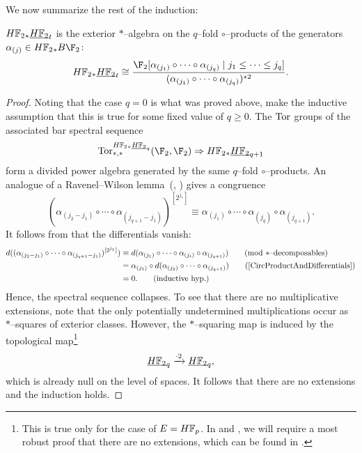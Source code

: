 We now summarize the rest of the induction:
\begin{theorem}\label{UnstableSteenrodInduction}
\(\HFtwo_* \OS{\HFtwo}{t}\) is the exterior \(\ast\)--algebra on the \(q\)--fold \(\circ\)--products of the generators \(\alpha_{(j)} \in \HFtwo_* B\F_2\): \[\HFtwo_* \OS{\HFtwo}{t} \cong \frac{\F_2[\alpha_{(j_1)} \circ \cdots \circ \alpha_{(j_q)} \mid j_1 \le \cdots \le j_q]}{(\alpha_{(j_1)} \circ \cdots \circ \alpha_{(j_q)})^{\ast 2}}.\]
\end{theorem}
\begin{proof}
Noting that the case \(q = 0\) is what was proved above, make the inductive assumption that this is true for some fixed value of \(q \ge 0\).  The \(\operatorname{Tor}\) groups of the associated bar spectral sequence \[\Tor^{\HFtwo_* \OS{\HFtwo}{q}}_{*, *}(\F_2, \F_2) \Rightarrow \HFtwo_* \OS{\HFtwo}{q+1}\] form a divided power algebra generated by the same \(q\)--fold \(\circ\)--products.  An analogue of a Ravenel--Wilson lemma~(\cite[Lemma 9.5]{RavenelWilsonKthyOfEMSpaces}, \cite[Claim 8.16]{Wilson}) gives a congruence \[(\alpha_{(j_2-j_1)} \circ \cdots \circ \alpha_{(j_{q+1}-j_1)})^{[2^{j_1}]} \equiv \alpha_{(j_1)} \circ \cdots \circ \alpha_{(j_q)} \circ \alpha_{(j_{q+1})} \tag{mod \(\ast\)--decomposables}.\]  It follows from  that the differentials vanish:
\begin{align*}
d((\alpha_{(j_2-j_1)} \circ \cdots \circ \alpha_{(j_{q+1}-j_1)})^{[2^{j_1}]}) & \equiv d(\alpha_{(j_1)} \circ \cdots \circ \alpha_{(j_t)} \circ \alpha_{(j_{q+1})}) \tag{mod \(\ast\)--decomposables} \\
& = \alpha_{(j_1)} \circ d(\alpha_{(j_2)} \circ \cdots \circ \alpha_{(j_{q+1})}) \tag{\Cref{CircProductAndDifferentials}} \\
& = 0. \tag{inductive hyp.}
\end{align*}
Hence, the spectral sequence collapses.  To see that there are no multiplicative extensions, note that the only potentially undetermined multiplications occur as \(\ast\)--squares of exterior classes.  However, the \(\ast\)--squaring map is induced by the topological map\footnote{This is true only for the case of \(E = \HFp\).  In  and , we will require a most robust proof that there are no extensions, which can be found in \cite[Proof of 8.11]{Wilson}.} \[\OS{\HFtwo}{q} \xrightarrow{\cdot 2} \OS{\HFtwo}{q},\] which is already null on the level of spaces.  It follows that there are no extensions and the induction holds.
\end{proof}

